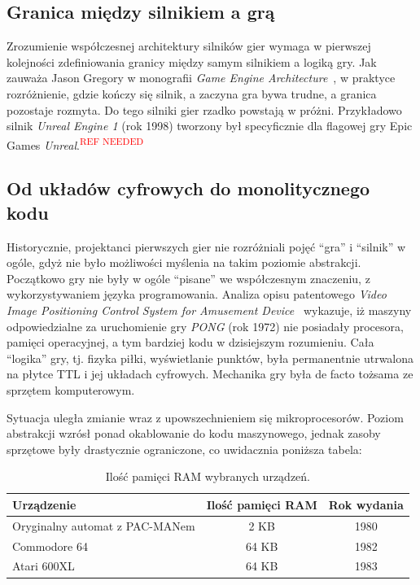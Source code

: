 \documentclass[
    bindingoffset=5mm,
    footnoteindent=3mm,
    hyphenation=true
]{src/wut-thesis}
\newcommand{\refneeded}[1]{\textsuperscript{\textcolor{red}{#1}}}
\begin{document}
\subsection{Granica między silnikiem a grą}

Zrozumienie współczesnej architektury silników gier wymaga w pierwszej kolejności
zdefiniowania granicy między samym silnikiem a logiką gry. Jak zauważa Jason
Gregory w monografii \emph{Game Engine Architecture}~\cite{GEA}, w praktyce rozróżnienie, gdzie
kończy się silnik, a zaczyna gra bywa trudne, a granica pozostaje rozmyta. Do tego
silniki gier rzadko powstają w próżni. Przykładowo silnik \emph{Unreal Engine 1} (rok 1998)
tworzony był specyficznie dla flagowej gry Epic Games \emph{Unreal}.\refneeded{REF NEEDED}

\subsection{Od układów cyfrowych do monolitycznego kodu}

Historycznie, projektanci pierwszych gier nie rozróżniali pojęć “gra” i “silnik” w ogóle,
gdyż nie było możliwości myślenia na takim poziomie abstrakcji. Początkowo gry nie
były w ogóle “pisane” we współczesnym znaczeniu, z wykorzystywaniem języka
programowania. Analiza opisu patentowego \emph{Video Image Positioning Control System
    for Amusement Device}~\cite{PONG} wykazuje, iż maszyny odpowiedzialne za uruchomienie
gry \emph{PONG} (rok 1972) nie posiadały procesora, pamięci operacyjnej, a tym bardziej
kodu w dzisiejszym rozumieniu. Cała “logika” gry, tj. fizyka piłki, wyświetlanie punktów,
była permanentnie utrwalona na płytce TTL i jej układach cyfrowych. Mechanika gry
była de facto tożsama ze sprzętem komputerowym.

Sytuacja uległa zmianie wraz z upowszechnieniem się mikroprocesorów. Poziom
abstrakcji wzrósł ponad okablowanie do kodu maszynowego, jednak zasoby sprzętowe
były drastycznie ograniczone, co uwidacznia poniższa tabela:

\begin{table}[!h] \centering
    \caption{Ilość pamięci RAM wybranych urządzeń.}
    \begin{tabular}{| l | c | c |} \hline
        Urządzenie                     & Ilość pamięci RAM & Rok wydania \\ \hline\hline
        Oryginalny automat z PAC-MANem & 2 KB              & 1980        \\ \hline
        Commodore 64                   & 64 KB             & 1982        \\ \hline
        Atari 600XL                    & 64 KB             & 1983        \\ \hline
    \end{tabular}
\end{table}
\end{document}
